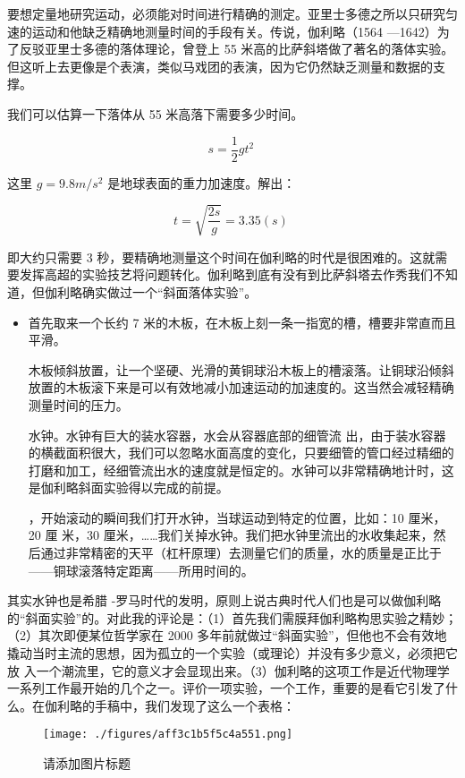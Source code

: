 要想定量地研究运动，必须能对时间进⾏精确的测定。亚里⼠多德之所以只研究匀速的运动和他缺乏精确地测量时间的⼿段有关。传说，伽利略（1564 —1642）为了反驳亚里⼠多德的落体理论，曾登上 55 米⾼的比萨斜塔做了著名的落体实验。但这听上去更像是个表演，类似马戏团的表演，因为它仍然缺乏测量和数据的支撑。

我们可以估算⼀下落体从 55 米⾼落下需要多少时间。

\begin{equation}
s=\frac{1}{2}gt^2~
\end{equation}

这里 $g = 9.8m/s^2$ 是地球表面的重⼒加速度。解出：

\begin{equation}
t=\sqrt{\frac{2s}{g}}=3.35(s)~
\end{equation}

即⼤约只需要 3 秒，要精确地测量这个时间在伽利略的时代是很困难的。这就需要发挥⾼超的实验技艺将问题转化。伽利略到底有没有到比萨斜塔去作秀我们不知道，但伽利略确实做过⼀个“斜面落体实验”。

\begin{itemize}
\item 首先取来⼀个长约 7 米的⽊板，在⽊板上刻⼀条⼀指宽的槽，槽要非常直⽽且平滑。

⽊板倾斜放置，让⼀个坚硬、光滑的黄铜球沿⽊板上的槽滚落。让铜球沿倾斜放置的⽊板滚下来是可以有效地减小加速运动的加速度的。这当然会减轻精确测量时间的压⼒。

⽔钟。⽔钟有巨⼤的装⽔容器，⽔会从容器底部的细管流
出，由于装⽔容器的横截面积很⼤，我们可以忽略⽔面⾼度的变化，只要细管的管⼝经过精细的打磨和加⼯，经细管流出⽔的速度就是恒定的。⽔钟可以非常精确地计时，这是伽利略斜面实验得以完成的前提。

，开始滚动的瞬间我们打开⽔钟，当球运动到特定的位置，比如：10 厘米，20 厘
米，30 厘米，……我们关掉⽔钟。我们把⽔钟里流出的⽔收集起来，然后通过非常精密的天平（杠杆原理）去测量它们的质量，⽔的质量是正比于——铜球滚落特定距离——所用时间的。
\end{itemize}

其实⽔钟也是希腊 -罗马时代的发明，原则上说古典时代⼈们也是可以做伽利略的“斜面实验”的。对此我的评论是：（1）首先我们需膜拜伽利略构思实验之精妙；（2）其次即便某位哲学家在 2000 多年前就做过“斜面实验”，但他也不会有效地撬动当时主流的思想，因为孤立的⼀个实验（或理论）并没有多少意义，必须把它放
⼊⼀个潮流里，它的意义才会显现出来。（3）伽利略的这项⼯作是近代物理学⼀系列⼯作最开始的⼏个之⼀。评价⼀项实验，⼀个⼯作，重要的是看它引发了什么。在伽利略的⼿稿中，我们发现了这么⼀个表格：
\begin{figure}[ht]
\centering
\texttt{[image: ./figures/aff3c1b5f5c4a551.png]}
\caption{请添加图片标题} \label{fig_AtomId_11}
\end{figure}
